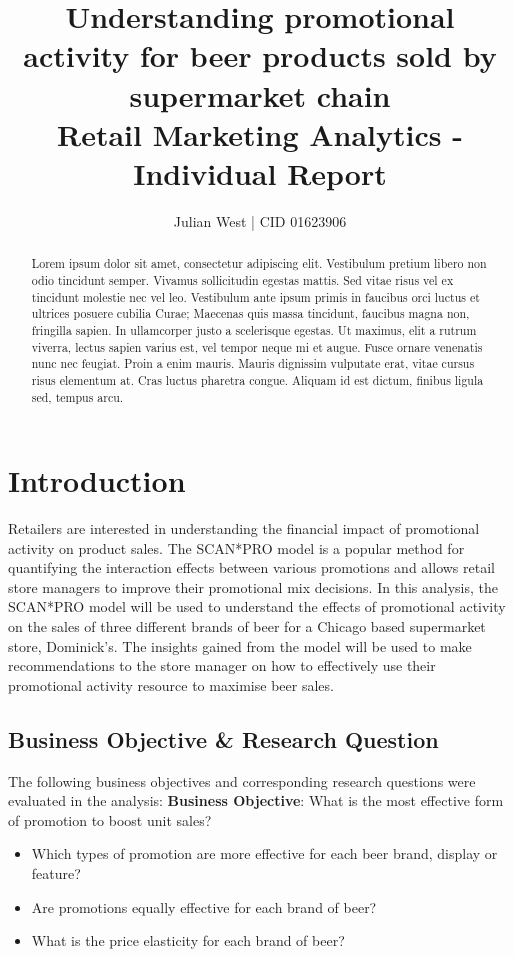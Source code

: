 \documentclass[a4paper,11pt]{article}
\title{Understanding promotional activity for beer products sold by supermarket chain  \\
\addlinespace
\large Retail Marketing Analytics - Individual Report }
\author{Julian West | CID 01623906}
\begin{document}
\maketitle

\begin{abstract}
Lorem ipsum dolor sit amet, consectetur adipiscing elit. Vestibulum pretium libero non odio tincidunt semper. Vivamus sollicitudin egestas mattis. Sed vitae risus vel ex tincidunt molestie nec vel leo. Vestibulum ante ipsum primis in faucibus orci luctus et ultrices posuere cubilia Curae; Maecenas quis massa tincidunt, faucibus magna non, fringilla sapien. In ullamcorper justo a scelerisque egestas. Ut maximus, elit a rutrum viverra, lectus sapien varius est, vel tempor neque mi et augue. Fusce ornare venenatis nunc nec feugiat. Proin a enim mauris. Mauris dignissim vulputate erat, vitae cursus risus elementum at. Cras luctus pharetra congue. Aliquam id est dictum, finibus ligula sed, tempus arcu. 
\end{abstract} \hspace{10pt}


\tableofcontents
\newpage

\section{Introduction}
Retailers are interested in understanding the financial impact of promotional activity on product sales. The SCAN*PRO model is a popular method for quantifying the interaction effects between various promotions and allows retail store managers to improve their promotional mix decisions. In this analysis, the SCAN*PRO model will be used to understand the effects of promotional activity on the sales of three different brands of beer for a Chicago based supermarket store, Dominick's. The insights gained from the model will be used to make recommendations to the store manager on how to effectively use their promotional activity resource to maximise beer sales.

\subsection{Business Objective \& Research Question}
The following business objectives and corresponding research questions were evaluated in the analysis:
\newline
\newline
\textbf{Business Objective}: What is the most effective form of promotion to boost unit sales?
\begin{itemize}
        \item Which types of promotion are more effective for each beer brand, display or feature?
        \item Are promotions equally effective for each brand of beer?
        \item What is the price elasticity for each brand of beer?
\end{itemize}
\newline
\newline
\end{document}
